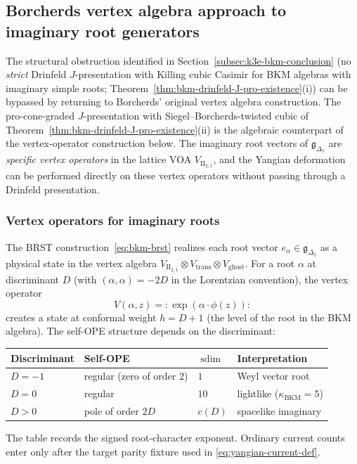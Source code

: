 \subsection{Borcherds vertex algebra approach to imaginary root generators}
\label{subsec:k3e-borcherds-vertex-yangian}

The structural obstruction identified in Section~\ref{subsec:k3e-bkm-conclusion} (no \emph{strict} Drinfeld $J$-presentation with Killing cubic Casimir for BKM algebras with imaginary simple roots; Theorem~\ref{thm:bkm-drinfeld-J-pro-existence}(i)) can be bypassed by returning to Borcherds' original vertex algebra construction. The pro-cone-graded $J$-presentation with Siegel--Borcherds-twisted cubic of Theorem~\ref{thm:bkm-drinfeld-J-pro-existence}(ii) is the algebraic counterpart of the vertex-operator construction below. The imaginary root vectors of $\mathfrak{g}_{\Delta_5}$ are \emph{specific vertex operators} in the lattice VOA $V_{\mathrm{II}_{2,1}}$, and the Yangian deformation can be performed directly on these vertex operators without passing through a Drinfeld presentation.

\subsubsection{Vertex operators for imaginary roots}
\label{subsubsec:k3e-vertex-ops-imaginary}

The BRST construction~\eqref{eq:bkm-brst} realizes each root vector $e_\alpha \in \mathfrak{g}_{\Delta_5}$ as a physical state in the vertex algebra $V_{\mathrm{II}_{2,1}} \otimes V_{\mathrm{trans}} \otimes V_{\mathrm{ghost}}$. For a root $\alpha$ at discriminant $D$ (with $(\alpha, \alpha) = -2D$ in the Lorentzian convention), the vertex operator
\begin{equation}
\label{eq:bkm-vertex-op}
V(\alpha, z) = {:}\exp(\alpha \cdot \phi(z)){:}
\end{equation}
creates a state at conformal weight $h = D + 1$ (the level of the root in the BKM algebra). The self-OPE structure depends on the discriminant:
\begin{center}
\renewcommand{\arraystretch}{1.3}
\begin{tabular}{@{}llll@{}}
\textbf{Discriminant} & \textbf{Self-OPE} & $\operatorname{sdim}$ & \textbf{Interpretation} \\ \hline
$D = -1$ & regular (zero of order $2$) & $1$ & Weyl vector root \\
$D = 0$ & regular & $10$ & lightlike ($\kappa_{\mathrm{BKM}} = 5$) \\
$D > 0$ & pole of order $2D$ & $c(D)$ & spacelike imaginary
\end{tabular}
\end{center}
The table records the signed root-character exponent. Ordinary current
counts enter only after the target parity fixture used in
\eqref{eq:yangian-current-def}.

